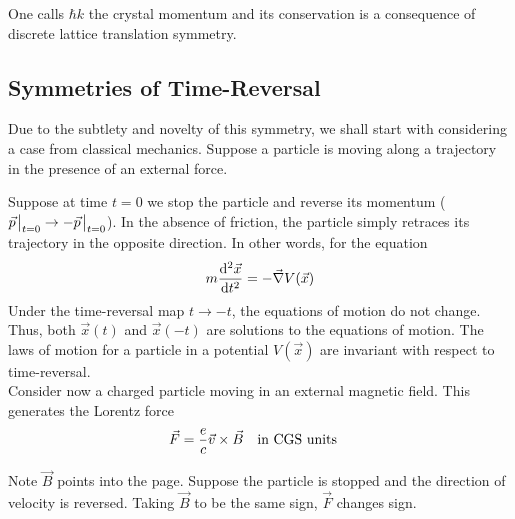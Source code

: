 \documentclass[12pt,a4paper,titlepage]{article}
\begin{document}
One calls $\hbar k$ the crystal momentum and its conservation is a consequence of discrete lattice translation symmetry.

\subsection{Symmetries of Time-Reversal}
Due to the subtlety and novelty of this symmetry, we shall start with considering a case from classical mechanics. Suppose a particle is moving along a trajectory in the presence of an external force.
\begin{center}
\end{center}
Suppose at time $t=0$ we stop the particle and reverse its momentum ($\vec{p}\eval_{t=0}\rightarrow-\vec{p}\eval_{t=0}$). In the absence of friction, the particle simply retraces its trajectory in the opposite direction. In other words, for the equation
\begin{equation}
m\dv[2]{\vec{x}}{t}=-\vec{\nabla}V(\vec{x})
\end{equation}
Under the time-reversal map $t\rightarrow-t$, the equations of motion do not change. Thus, both $\vec{x}(t)$ and $\vec{x}(-t)$ are solutions to the equations of motion. The laws of motion for a particle in a potential $V(\vec{x})$ are invariant with respect to time-reversal.\\

Consider now a charged particle moving in an external magnetic field. This generates the Lorentz force
\begin{equation}
\vec{F}=\frac{e}{c}\vec{v}\times\vec{B}\qq{in CGS units}
\end{equation}
\begin{center}
\end{center}
Note $\vec{B}$ points into the page. Suppose the particle is stopped and the direction of velocity is reversed. Taking $\vec{B}$ to be the same sign, $\vec{F}$ changes sign.
\end{document}
